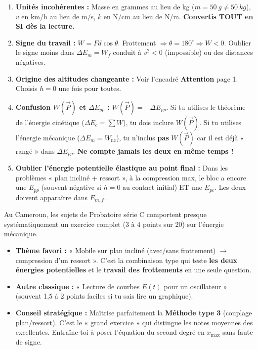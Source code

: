 \documentclass[11pt]{article}
\begin{document}
\begin{attention}
\begin{enumerate}
    \item \textbf{Unités incohérentes :} Masse en grammes au lieu de kg ($m=\SI{50}{g} \neq \SI{50}{kg}$), $v$ en km/h au lieu de m/s, $k$ en N/cm au lieu de N/m. \textbf{Convertis TOUT en SI dès la lecture.}
    \item \textbf{Signe du travail :} $W = F d \cos\theta$. Frottement $\Rightarrow \theta=180^\circ \Rightarrow W < 0$. Oublier le signe moins dans $\Delta E_m = W_f$ conduit à $v^2 < 0$ (impossible) ou des distances négatives.
    \item \textbf{Origine des altitudes changeante :} Voir l'encadré \textbf{Attention} page 1. Choisis $h=0$ une fois pour toutes.
    \item \textbf{Confusion $W(\vec{P})$ et $\Delta E_{pp}$ :} $W(\vec{P}) = -\Delta E_{pp}$. Si tu utilises le théorème de l'énergie cinétique ($\Delta E_c = \sum W$), tu dois inclure $W(\vec{P})$. Si tu utilises l'énergie mécanique ($\Delta E_m = W_{\text{nc}}$), tu n'inclus \textbf{pas} $W(\vec{P})$ car il est déjà « rangé » dans $\Delta E_{pp}$. \textbf{Ne compte jamais les deux en même temps !}
    \item \textbf{Oublier l'énergie potentielle élastique au point final :} Dans les problèmes « plan incliné + ressort », à la compression max, le bloc a encore une $E_{pp}$ (souvent négative si $h=0$ au contact initial) ET une $E_{pe}$. Les deux doivent apparaître dans $E_{m,f}$.
\end{enumerate}
\end{attention}

\begin{savaistu}
Au Cameroun, les sujets de Probatoire série C comportent presque systématiquement un exercice complet (3 à 4 points sur 20) sur l'énergie mécanique.
\begin{itemize}
    \item \textbf{Thème favori :} « Mobile sur plan incliné (avec/sans frottement) $\to$ compression d'un ressort ». C'est la combinaison type qui teste \textbf{les deux énergies potentielles} et le \textbf{travail des frottements} en une seule question.
    \item \textbf{Autre classique :} « Lecture de courbes $E(t)$ pour un oscillateur » (souvent 1,5 à 2 points faciles si tu sais lire un graphique).
    \item \textbf{Conseil stratégique :} Maîtrise parfaitement la \textbf{Méthode type 3} (couplage plan/ressort). C'est le « grand exercice » qui distingue les notes moyennes des excellentes. Entraîne-toi à poser l'équation du second degré en $x_{\text{max}}$ sans faute de signe.
\end{itemize}
\end{savaistu}
\end{document}
